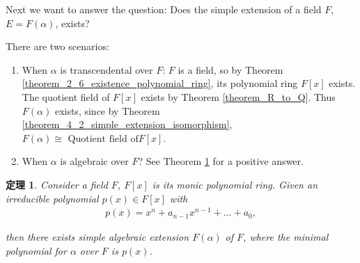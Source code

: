 \documentclass[utf8]{ctexbook}
\newtheorem{theorem}{定理}[section]
\begin{document}
Next we want to answer the question: Does the simple extension of a field $F$, $E=F(\alpha)$, exists? 

There are two scenarios:
\begin{enumerate}
\item{When $\alpha$ is transcendental over $F$: $F$ is a field, so by Theorem \ref{theorem_2_6_existence_polynomial_ring}, its polynomial ring $F[x]$ exists. The quotient field of $F[x]$ exists by Theorem \ref{theorem_R_to_Q}. Thus $F(\alpha)$ exists, since by Theorem \ref{theorem_4_2_simple_extension_isomorphism}, $F(\alpha) \cong \mbox{ Quotient field of} F[x]$.
}
\item{When $\alpha$ is algebraic over $F$? See Theorem \ref{theorem_4_2_3_existence_simple_alge_extension} for a positive answer.}
\end{enumerate}

\begin{theorem}
\label{theorem_4_2_3_existence_simple_alge_extension}
Consider a field $F$, $F[x]$ is its monic polynomial ring. Given an irreducible polynomial $p(x) \in F[x]$ with
\begin{align*}
p(x) = x^n + a_{n-1} x^{n-1} + \ldots + a_0 ,
\end{align*}

then there exists simple algebraic extension $F(\alpha)$ of $F$, where the minimal polynomial for $\alpha$ over $F$ is $p(x)$.

\end{theorem}
\end{document}
